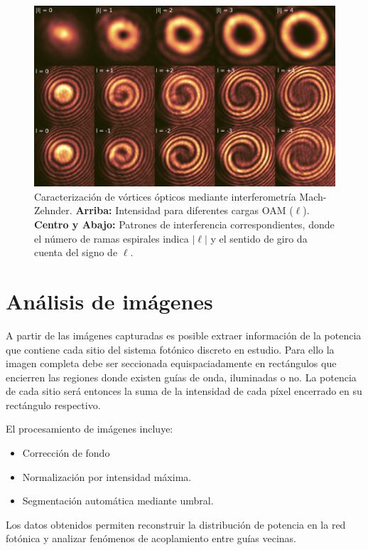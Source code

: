 \begin{figure}[H]
	\centering
	\includegraphics[width=0.8\linewidth]{media/OAM-free.png}
	\caption[Caracterización de vórtices ópticos mediante interferometría Mach-Zehnder.]{Caracterización de vórtices ópticos mediante interferometría Mach-Zehnder. \textbf{Arriba:} Intensidad para diferentes cargas OAM ($\ell$). \textbf{Centro y Abajo:} Patrones de interferencia correspondientes, donde el número de ramas espirales indica $|\ell|$ y el sentido de giro da cuenta del signo de $\ell$.}
	\label{fig:OAM}
\end{figure}
\section{Análisis de imágenes \label{sec:analimag}}
A partir de las imágenes capturadas es posible extraer información de la potencia que contiene cada sitio del sistema fotónico discreto en estudio. Para ello la imagen completa debe ser seccionada equispaciadamente en rectángulos que encierren las regiones donde existen guías de onda, iluminadas o no. La potencia de cada sitio será entonces la suma de la intensidad de cada píxel encerrado en su rectángulo respectivo.

El procesamiento de imágenes incluye:
\begin{itemize}
    \item Corrección de fondo
    \item Normalización por intensidad máxima.
    \item Segmentación automática mediante umbral.
\end{itemize}

Los datos obtenidos permiten reconstruir la distribución de potencia en la red fotónica y analizar fenómenos de acoplamiento entre guías vecinas.